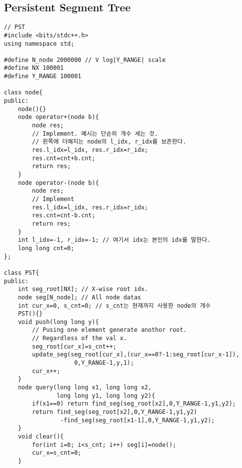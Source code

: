 \documentclass[10pt, landscape]{article}
\begin{document}
\begin{multicols}{2}
\subsection{Persistent Segment Tree}
\begin{verbatim}
// PST
#include <bits/stdc++.h>
using namespace std;

#define N_node 2000000 // V log|Y_RANGE| scale 
#define NX 100001
#define Y_RANGE 100001

class node{
public:
    node(){}
    node operator+(node b){
        node res;
        // Implement. 예시는 단순히 개수 세는 것.
        // 왼쪽에 더해지는 node의 l_idx, r_idx를 보존한다.
        res.l_idx=l_idx, res.r_idx=r_idx;
        res.cnt=cnt+b.cnt;
        return res;
    }
    node operator-(node b){
        node res;
        // Implement
        res.l_idx=l_idx, res.r_idx=r_idx;
        res.cnt=cnt-b.cnt;
        return res;
    }
    int l_idx=-1, r_idx=-1; // 여기서 idx는 본인의 idx를 말한다.
    long long cnt=0;    
};

class PST{
public:
    int seg_root[NX]; // X-wise root idx.
    node seg[N_node]; // All node datas
    int cur_x=0, s_cnt=0; // s_cnt는 현재까지 사용한 node의 개수
    PST(){}
    void push(long long y){
        // Pusing one element generate anothor root. 
        // Regardless of the val x.
        seg_root[cur_x]=s_cnt++;
        update_seg(seg_root[cur_x],(cur_x==0?-1:seg_root[cur_x-1]),
                    0,Y_RANGE-1,y,1);
        cur_x++;
    }
    node query(long long x1, long long x2, 
               long long y1, long long y2){
        if(x1==0) return find_seg(seg_root[x2],0,Y_RANGE-1,y1,y2);
        return find_seg(seg_root[x2],0,Y_RANGE-1,y1,y2)
                -find_seg(seg_root[x1-1],0,Y_RANGE-1,y1,y2);
    }
    void clear(){
        for(int i=0; i<s_cnt; i++) seg[i]=node();
        cur_x=s_cnt=0;
    }


\end{verbatim}
\end{multicols}
\end{document}
